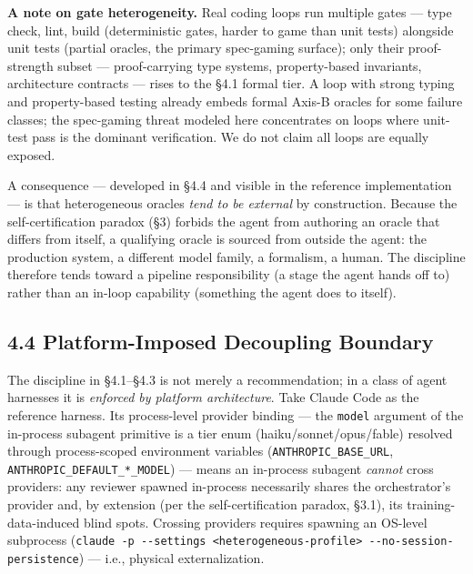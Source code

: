 \documentclass[
  11pt,
]{article}
\begin{document}
\textbf{A note on gate heterogeneity.} Real coding loops run multiple
gates --- type check, lint, build (deterministic gates, harder to game
than unit tests) alongside unit tests (partial oracles, the primary
spec-gaming surface); only their proof-strength subset ---
proof-carrying type systems, property-based invariants, architecture
contracts --- rises to the §4.1 formal tier. A loop with strong typing
and property-based testing already embeds formal Axis-B oracles for some
failure classes; the spec-gaming threat modeled here concentrates on
loops where unit-test pass is the dominant verification. We do not claim
all loops are equally exposed.

A consequence --- developed in §4.4 and visible in the reference
implementation --- is that heterogeneous oracles \emph{tend to be
external} by construction. Because the self-certification paradox (§3)
forbids the agent from authoring an oracle that differs from itself, a
qualifying oracle is sourced from outside the agent: the production
system, a different model family, a formalism, a human. The discipline
therefore tends toward a pipeline responsibility (a stage the agent
hands off to) rather than an in-loop capability (something the agent
does to itself).

\subsection{4.4 Platform-Imposed Decoupling
Boundary}\label{platform-imposed-decoupling-boundary}

The discipline in §4.1--§4.3 is not merely a recommendation; in a class
of agent harnesses it is \emph{enforced by platform architecture}. Take
Claude Code as the reference harness. Its process-level provider binding
--- the \texttt{model} argument of the in-process subagent primitive is
a tier enum (haiku/sonnet/opus/fable) resolved through process-scoped
environment variables (\texttt{ANTHROPIC\_BASE\_URL},
\texttt{ANTHROPIC\_DEFAULT\_*\_MODEL}) --- means an in-process subagent
\emph{cannot} cross providers: any reviewer spawned in-process
necessarily shares the orchestrator's provider and, by extension (per
the self-certification paradox, §3.1), its training-data-induced blind
spots. Crossing providers requires spawning an OS-level subprocess
(\texttt{claude\ -p\ -\/-settings\ \textless{}heterogeneous-profile\textgreater{}\ -\/-no-session-persistence})
--- i.e., physical externalization.
\end{document}
